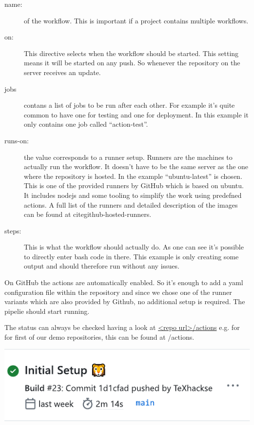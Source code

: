 \documentclass[final]{ltugboat}
\begin{document}
\begin{description}
\item[name:] of the workflow.
This is important if a project contains multiple workflows.

\item[on:] This directive selects when the workflow should be started.
This setting means it will be started on any push. So whenever the repository on the server receives an update.

\item[jobs] contans a list of jobs to be run after each other.
For example it's quite common to have one for testing and one for deployment.
In this example it only contains one job called \enquote{action-test}.

\item[runs-on:] the value corresponds to a runner setup.
Runners are the machines to actually run the workflow.
It doesn't have to be the same server as the one where the repository is hosted.
In the example \enquote{ubuntu-latest} is chosen.
This is one of the provided runners by GitHub which is based on ubuntu.
It includes nodejs and some tooling to simplify the work using predefned actions.
A full list of the runners and detailed description of the images can be found at cite{github-hosted-runners}.

\item[steps:] This is what the workflow should actually do.
As one can see it's possible to directly enter bash code in there.
This example is only creating some output and should therefore run without any issues.
\end{description}

On GitHub the actions are automatically enabled.
So it's enough to add a yaml configuration file within the repository and since we chose one of the runner variants which are also provided by Github, no additional setup is required.
The pipelie should start running.

The status can always be checked having a look at
\url*{<repo url>/actions} e.g. for for first of our demo repositories, this can be found at
/actions.%

\noindent\includegraphics[width=\linewidth]{screenshot-pipeline-successful}
\end{document}
